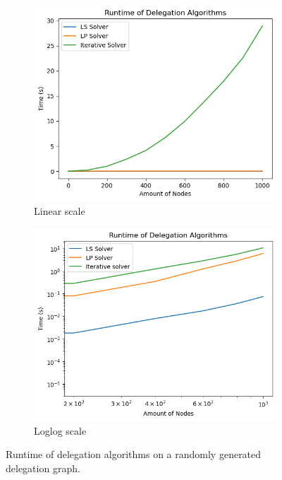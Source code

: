 \begin{figure}[h]
    \centering
    \begin{subfigure}[t]{0.45\textwidth}
    	\centering
    	\includegraphics[width=\textwidth]{0-1000_cycle}
    	\caption{Linear scale}
    	\label{subfig:cycle-small-linear}
    \end{subfigure}
    \hfill
    \begin{subfigure}[t]{0.45\textwidth}
        \centering
        \includegraphics[width=\textwidth]{0-1000_dense_loglog}
        \caption{Loglog scale}
         \label{subfig:cycle-small-loglog}
    \end{subfigure}
    \caption{Runtime of delegation algorithms on a randomly generated delegation graph.}
    \label{fig:cycle_small}
\end{figure}


